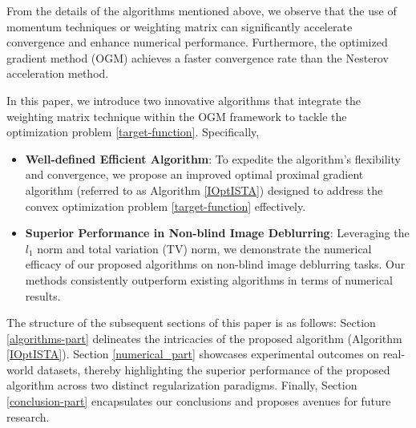 \documentclass{article}
\begin{document}
From the details of the algorithms mentioned above, we observe that the use of momentum techniques or weighting matrix can significantly accelerate convergence and enhance numerical performance. Furthermore, the optimized gradient method (OGM) achieves a faster convergence rate than the Nesterov acceleration method.

In this paper, we introduce two innovative algorithms that integrate the weighting matrix technique within the OGM framework to tackle the optimization problem \eqref{target-function}. Specifically,
\begin{itemize}
    \item \textbf{Well-defined Efficient Algorithm}: To expedite the algorithm's flexibility and convergence, we propose an improved optimal proximal gradient algorithm (referred to as Algorithm \ref{IOptISTA}) designed to address the convex optimization problem \eqref{target-function} effectively.
    \item \textbf{Superior Performance in Non-blind Image Deblurring}: Leveraging the $l_1$ norm and total variation (TV) norm, we demonstrate the numerical efficacy of our proposed algorithms on non-blind image deblurring tasks. Our methods consistently outperform existing algorithms in terms of numerical results.
\end{itemize}

The structure of the subsequent sections of this paper is as follows: Section \ref{algorithms-part} delineates the intricacies of the proposed algorithm (Algorithm \ref{IOptISTA}). Section \ref{numerical_part} showcases experimental outcomes on real-world datasets, thereby highlighting the superior performance of the proposed algorithm across two distinct regularization paradigms. Finally, Section \ref{conclusion-part} encapsulates our conclusions and proposes avenues for future research.

\end{document}
